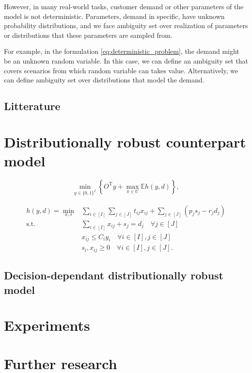 \documentclass[12pt, letterpaper]{article}
\newcommand{\R}{\mathbb{R}}
\newcommand{\T}{\mathrm{T}}
\newcommand{\E}{\mathbb{E}}
\newcommand{\Dcal}{\mathcal{D}}
\begin{document}
	However, in many real-world tasks, customer demand or other parameters of the model is not deterministic. Parameters, demand in specific, have unknown probability distributions, and we face ambiguity set over realization of parameters or distributions that these parameters are sampled from.

	For example, in the formulation \ref{eq:deterministic_problem}, the demand might be an unknown random variable. In this case, we can define an ambiguity set that covers scenarios from which random variable can takes value. Alternatively, we can define ambiguity set over distributions that model the demand. 
	\subsection*{Litterature}
	
	\section{Distributionally robust counterpart model}
	\begin{equation}\label{eq:dro_outterproblem}
		\min_{y \in \{0, 1\}^I} \left\{O^\T y + \max_{\pi \in U} \E h(y, d)\right\},
	\end{equation}
	
	\begin{subequations}
		\begin{align} \label{eq:dro_innerproblem}
			h(y, d) = \min_{x, s} &\sum_{i \in [I]} \sum_{j \in [J]} t_{ij}x_{ij} + \sum_{j \in [J]} (p_j s_j - r_j d_j) \\
			\text{s.t.} &\sum_{i \in [I]} x_{ij} + s_j = d_j \quad \forall j \in [J] \\
			&x_{ij} \le C_i y_i \quad \forall i \in [I], j \in [J] \\
			&s_i, x_{ij} \ge 0 \quad \forall i \in [I], j \in [J].
		\end{align}
	\end{subequations}
	
	\subsection{Decision-dependant distributionally robust model}
	
	\section{Experiments}
	
	\section{Further research}
	
	
	
\end{document}
